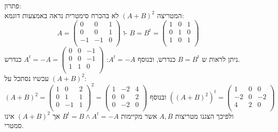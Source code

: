 \documentclass{article}
\begin{document}
	פתרון: \\
	המטריצה $(A+B)^2$ לא בהכרח סימטרית נראה באמצעות דוגמא:
	\[
		A = \begin{pmatrix}
			0 & 0 & 1 \\
			0 & 0 & 1 \\
			-1 & -1 & 0 \\
		\end{pmatrix}
		\text{ ו- }
		B = B^t = \begin{pmatrix}
			1 & 0 & 1 \\
			0 & 1 & 0 \\
			1 & 0 & 1 \\
		\end{pmatrix}
		\]
		ניתן לראות ש $B = B^t$ כנדרש, ובנוסף $A^t = -A$:
		$A^t = -A = \begin{pmatrix}
				0 & 0 & -1 \\
				0 & 0 & -1 \\
				1 & 1 & 0 \\
			\end{pmatrix}$
		כנדרש. \\
		עכשיו נסתכל על $(A+B)^2$:
		\[
			(A+B)^2 = \begin{pmatrix}
				1 & 0 & 2 \\
				0 & 1 & 1 \\
				0 & -1 & 1\\
			\end{pmatrix}^2 =
			\begin{pmatrix}
				1 & -2 & 4 \\
				0 & 0 & 2 \\
				0 & -2 & 0 \\
			\end{pmatrix}
			\text{ ובנוסף }
			((A+B)^2)^t = \begin{pmatrix}
				1 & 0 & 0 \\
				-2 & 0 & -2 \\
				4 & 2 & 0 \\
			\end{pmatrix}
		\]
		ולפיכך הצגנו מטריצות $A,B$ אשר מקיימות $B^t = B \land A^t = -A$  אך $(A+B)^2$ אינו סמטרי.
\end{document}
